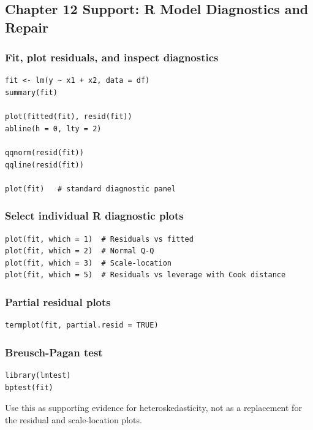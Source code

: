 \subsection{Chapter 12 Support: R Model Diagnostics and Repair}
\label{app:ch12-software-cookbook-r}

\subsubsection*{Fit, plot residuals, and inspect diagnostics}

\begin{verbatim}
fit <- lm(y ~ x1 + x2, data = df)
summary(fit)

plot(fitted(fit), resid(fit))
abline(h = 0, lty = 2)

qqnorm(resid(fit))
qqline(resid(fit))

plot(fit)   # standard diagnostic panel
\end{verbatim}

\subsubsection*{Select individual R diagnostic plots}

\begin{verbatim}
plot(fit, which = 1)  # Residuals vs fitted
plot(fit, which = 2)  # Normal Q-Q
plot(fit, which = 3)  # Scale-location
plot(fit, which = 5)  # Residuals vs leverage with Cook distance
\end{verbatim}

\subsubsection*{Partial residual plots}

\begin{verbatim}
termplot(fit, partial.resid = TRUE)
\end{verbatim}

\subsubsection*{Breusch-Pagan test}

\begin{verbatim}
library(lmtest)
bptest(fit)
\end{verbatim}

Use this as supporting evidence for heteroskedasticity, not as a replacement for the residual and scale-location plots.

